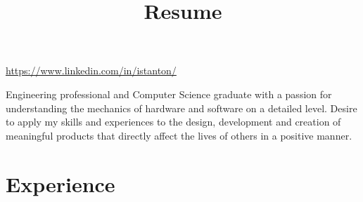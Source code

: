 \documentclass[]{deedy-resume-openfont}
\begin{document}
\title{Resume}
%
%

%
%
\vspace{10pt}

\href{https://www.linkedin.com/in/istanton/}{https://www.linkedin.com/in/istanton/}

\vspace{\topsep}
Engineering professional and Computer Science graduate with a passion for understanding the mechanics of hardware and software on a detailed level. Desire to apply my skills and experiences to the design, development and creation of meaningful products that directly affect the lives of others in a positive manner.

\section{Experience}
\end{document}
